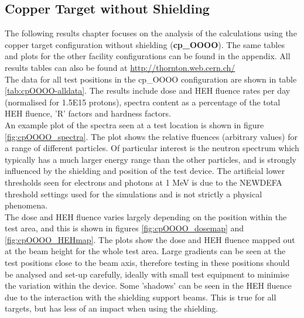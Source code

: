 \clearpage

\subsection{Copper Target without Shielding}

The following results chapter focuses on the analysis of the calculations using the copper target configuration without shielding (\textbf{cp\_OOOO}). The same tables and plots for the other facility configurations can be found in the appendix. All results tables can also be found at \url{http://thornton.web.cern.ch/}  \\

The data for all test positions in the cp\_OOOO configuration are shown in table \ref{tab:cpOOOO-alldata}. The results include dose and HEH fluence rates per day (normalised for 1.5E15 protons), spectra content as a percentage of the total HEH fluence, 'R' factors and hardness factors. \\

An example plot of the spectra seen at a test location is shown in figure \ref{fig:cpOOOO_spectra}. The plot shows the relative fluences (arbitrary values) for a range of different particles. Of particular interest is the neutron spectrum which typically has a much larger energy range than the other particles, and is strongly influenced by the shielding and position of the test device. The artificial lower thresholds seen for electrons and photons at 1 MeV is due to the NEWDEFA threshold settings used for the simulations and is not strictly a physical phenomena. \\

The dose and HEH fluence varies largely depending on the position within the test area, and this is shown in figures \ref{fig:cpOOOO_dosemap} and \ref{fig:cpOOOO_HEHmap}. The plots show the dose and HEH fluence mapped out at the beam height for the whole test area. Large gradients can be seen at the test positions close to the beam axis, therefore testing in these positions should be analysed and set-up carefully, ideally with small test equipment to minimise the variation within the device. Some 'shadows' can be seen in the HEH fluence due to the interaction with the shielding support beams. This is true for all targets, but has less of an impact when using the shielding. \\

